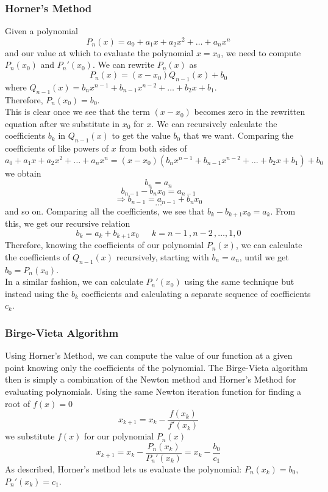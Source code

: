 \documentclass[12pt, oneside]{article}
\begin{document}
\subsubsection*{Horner's Method}
Given a polynomial
\[P_n(x) = a_0 + a_1x + a_2x^2 + \dots + a_nx^n\]
and our value at which to evaluate the polynomial $x = x_0$, we need to compute $P_n(x_0)$ and $P_n'(x_0)$. We can rewrite $P_n(x)$ as
\[P_n(x) = (x-x_0)Q_{n-1}(x) + b_0 \]
where $Q_{n-1}(x) = b_nx^{n-1} + b_{n-1}x^{n-2} + \dots + b_2x + b_1$.\\
Therefore, $P_n(x_0) = b_0$.\\ This is clear once we see that the term $(x-x_0)$ becomes zero in the rewritten equation after we substitute in $x_0$ for $x$. We can recursively calculate the coefficients $b_k$ in $Q_{n-1}(x)$ to get the value $b_0$ that we want. Comparing the coefficients of like powers of $x$ from both sides of
\[a_0 + a_1x + a_2x^2 + \dots + a_nx^n = (x-x_0)(b_nx^{n-1} + b_{n-1}x^{n-2} + \dots + b_2x + b_1) + b_0\]
we obtain
\[b_n = a_n\]
\[b_{n-1} - b_nx_0 = a_{n-1}\]
\[\Rightarrow b_{n-1} = a_{n-1} + b_nx_0\]
\[\dots \]
and so on. Comparing all the coefficients, we see that $b_k - b_{k+1}x_0 = a_k$. From this, we get our recursive relation 
\[b_k = a_k + b_{k+1}x_0\,\,\,\,\,\,\,\,\,k=n-1\,,n-2\,,\dots,1,0 \]
Therefore, knowing the coefficients of our polynomial $P_n(x)$, we can calculate the coefficients of $Q_{n-1}(x)$ recursively, starting with $b_n = a_n$, until we get $b_0 = P_n(x_0)$.\\
In a similar fashion, we can calculate $P_n'(x_0)$ using the same technique but instead using the $b_k$ coefficients and calculating a separate sequence of coefficients $c_k$.

\subsubsection*{Birge-Vieta Algorithm}
Using Horner's Method, we can compute the value of our function at a given point knowing only the coefficients of the polynomial. The Birge-Vieta algorithm then is simply a combination of the Newton method and Horner's Method for evaluating polynomials. Using the same Newton iteration function for finding a root of $f(x) = 0$
\[x_{k+1} = x_k - \frac{f(x_k)}{f'(x_k)} \]
we substitute $f(x)$ for our polynomial $P_n(x)$
\[x_{k+1} = x_k - \frac{P_n(x_k)}{P_n'(x_k)} = x_k - \frac{b_0}{c_1}\]
As described, Horner's method lets us evaluate the polynomial: $P_n(x_k) = b_0$, $P_n'(x_k) = c_1$.\\
\end{document}
